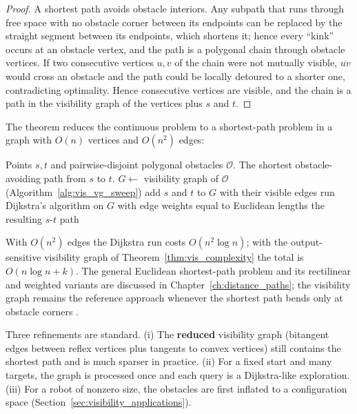 \begin{proof}
  A shortest path avoids obstacle interiors. Any subpath that runs through
  free space with no obstacle corner between its endpoints can be replaced
  by the straight segment between its endpoints, which shortens it; hence
  every ``kink'' occurs at an obstacle vertex, and the path is a polygonal
  chain through obstacle vertices. If two consecutive vertices $u, v$ of the
  chain were not mutually visible, $\overline{uv}$ would cross an obstacle
  and the path could be locally detoured to a shorter one, contradicting
  optimality. Hence consecutive vertices are visible, and the chain is a
  path in the visibility graph of the vertices plus $s$ and $t$.
\end{proof}

The theorem reduces the continuous problem to a shortest-path problem in a
graph with $O(n)$ vertices and $O(n^2)$ edges:

\begin{algorithm}[htbp]
\caption{Shortest Path among Polygonal Obstacles}
\label{alg:vis_shortest_path}
\begin{algorithmic}[1]
\Require Points $s, t$ and pairwise-disjoint polygonal obstacles $\mathcal{O}$.
\Ensure The shortest obstacle-avoiding path from $s$ to $t$.
  \State $G \gets$ visibility graph of $\mathcal{O}$ (Algorithm~\ref{alg:vis_vg_sweep})
  \State add $s$ and $t$ to $G$ with their visible edges
  \State run Dijkstra's algorithm on $G$ with edge weights equal to Euclidean lengths
  \State \Return the resulting $s$-$t$ path
\EndFunction
\end{algorithmic}
\end{algorithm}

With $O(n^2)$ edges the Dijkstra run costs $O(n^2 \log n)$; with the
output-sensitive visibility graph of Theorem~\ref{thm:vis_complexity} the
total is $O(n \log n + k)$. The general Euclidean shortest-path problem and
its rectilinear and weighted variants are discussed in
Chapter~\ref{ch:distance_paths}; the visibility graph remains the reference
approach whenever the shortest path bends only at obstacle corners
\cite{lozanoperez1983,berg2008}.

\begin{remark}\label{rem:vis_spp_directions}
  Three refinements are standard. (i) The \textbf{reduced} visibility graph
  (bitangent edges between reflex vertices plus tangents to convex vertices)
  still contains the shortest path and is much sparser in practice. (ii) For
  a fixed start and many targets, the graph is processed once and each query
  is a Dijkstra-like exploration. (iii) For a robot of nonzero size, the
  obstacles are first inflated to a configuration space
  (Section~\ref{sec:visibility_applications}).
\end{remark}


